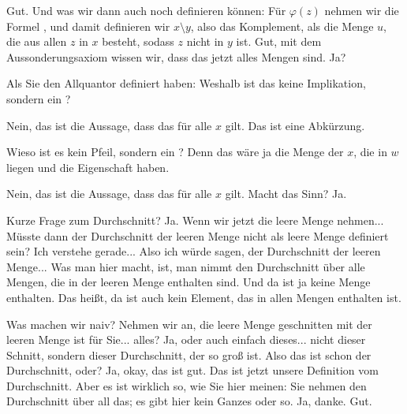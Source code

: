 \begin{spoken-clean}[00:36:56 - 00:38:38]
Gut. Und was wir dann auch noch definieren können: Für $\varphi(z)$ nehmen wir die Formel , und damit definieren wir $x \setminus y$, also das Komplement, als die Menge $u$, die aus allen $z$ in $x$ besteht, sodass $z$ nicht in $y$ ist. Gut, mit dem Aussonderungsaxiom wissen wir, dass das jetzt alles Mengen sind. Ja?
\end{spoken-clean}

\begin{student-interaction}[Studentenfrage]
Als Sie den Allquantor definiert haben: Weshalb ist das keine Implikation, sondern ein ?
\end{student-interaction}

\begin{spoken-clean}[continued]
Nein, das ist die Aussage, dass das für alle $x$ gilt. Das ist eine Abkürzung.
\end{spoken-clean}

\begin{student-interaction}[Studentenfrage]
Wieso ist es kein Pfeil, sondern ein ? Denn das wäre ja die Menge der $x$, die in $w$ liegen und die Eigenschaft haben.
\end{student-interaction}

\begin{spoken-clean}[continued]
Nein, das ist die Aussage, dass das für alle $x$ gilt. Macht das Sinn? Ja.
\end{spoken-clean}

\begin{spoken-clean}[00:39:35 - 00:40:53]
Kurze Frage zum Durchschnitt? Ja. Wenn wir jetzt die leere Menge nehmen... Müsste dann der Durchschnitt der leeren Menge nicht als leere Menge definiert sein? Ich verstehe gerade... Also ich würde sagen, der Durchschnitt der leeren Menge... Was man hier macht, ist, man nimmt den Durchschnitt über alle Mengen, die in der leeren Menge enthalten sind. Und da ist ja keine Menge enthalten. Das heißt, da ist auch kein Element, das in allen Mengen enthalten ist.

Was machen wir naiv? Nehmen wir an, die leere Menge geschnitten mit der leeren Menge ist für Sie... alles? Ja, oder auch einfach dieses... nicht dieser Schnitt, sondern dieser Durchschnitt, der so groß ist. Also das ist schon der Durchschnitt, oder? Ja, okay, das ist gut. Das ist jetzt unsere Definition vom Durchschnitt. Aber es ist wirklich so, wie Sie hier meinen: Sie nehmen den Durchschnitt über all das; es gibt hier kein Ganzes oder so. Ja, danke. Gut.
\end{spoken-clean}

